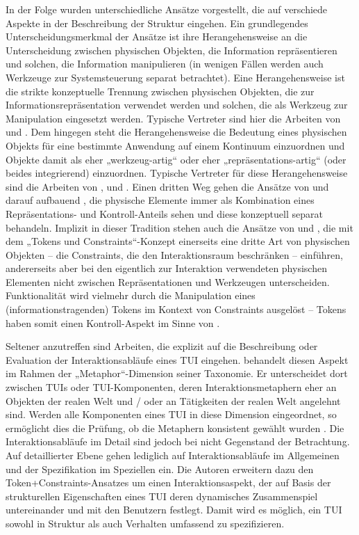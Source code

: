In der Folge wurden unterschiedliche Ansätze vorgestellt, die auf verschiede Aspekte in der Beschreibung der Struktur eingehen. Ein grundlegendes Unterscheidungsmerkmal der Ansätze ist ihre Herangehensweise an die Unterscheidung zwischen physischen Objekten, die Information repräsentieren und solchen, die Information manipulieren (in wenigen Fällen werden auch Werkzeuge zur Systemsteuerung separat betrachtet). Eine Herangehensweise ist die strikte konzeptuelle Trennung zwischen physischen Objekten, die zur Informationsrepräsentation verwendet werden und solchen, die als Werkzeug zur Manipulation eingesetzt werden. Typische Vertreter sind hier die Arbeiten von \citet{Ishii97} und \citet{Holmquist99}. Dem hingegen steht die Herangehensweise die Bedeutung eines physischen Objekts für eine bestimmte Anwendung auf einem Kontinuum einzuordnen und Objekte damit als eher „werkzeug-artig“ oder eher „repräsentations-artig“ (oder beides integrierend) einzuordnen. Typische Vertreter für diese Herangehensweise sind die Arbeiten von \citet{Underkoffler99}, \citet{Koleva03} und \citet{Fishkin04}. Einen dritten Weg gehen die Ansätze von \citet{Ullmer00} und darauf aufbauend \citet{Ishii08}, die physische Elemente immer als Kombination eines Repräsentations- und Kontroll-Anteils sehen und diese konzeptuell separat behandeln. Implizit in dieser Tradition stehen auch die Ansätze von \citet{Ullmer02} und \citet{Shaer04}, die mit dem „Tokens und Constraints“-Konzept einerseits eine dritte Art von physischen Objekten -- die Constraints, die den Interaktionsraum beschränken -- einführen, andererseits aber bei den eigentlich zur Interaktion verwendeten physischen Elementen nicht zwischen Repräsentationen und Werkzeugen unterscheiden. Funktionalität wird vielmehr durch die Manipulation eines (informationstragenden) Tokens im Kontext von Constraints ausgelöst -- Tokens haben somit einen Kontroll-Aspekt im Sinne von \citet{Ullmer00}.

Seltener anzutreffen sind Arbeiten, die explizit auf die Beschreibung oder Evaluation der Interaktionsabläufe eines \gls{TUI} eingehen. \citet{Fishkin04} behandelt diesen Aspekt im Rahmen der „Metaphor“-Dimension seiner Taxonomie. Er unterscheidet dort zwischen \glspl{TUI} oder \gls{TUI}-Komponenten, deren Interaktionsmetaphern eher an Objekten der realen Welt und / oder an Tätigkeiten der realen Welt angelehnt sind. Werden alle Komponenten eines \gls{TUI} in diese Dimension eingeordnet, so ermöglicht dies die Prüfung, ob die Metaphern konsistent gewählt wurden  
\citep{Oppl09d}. Die Interaktionsabläufe im Detail sind jedoch bei \citet{Fishkin04} nicht Gegenstand der Betrachtung. Auf detaillierter Ebene gehen lediglich \citet{Shaer04} auf Interaktionsabläufe im Allgemeinen und der Spezifikation im Speziellen ein. Die Autoren erweitern dazu den Token+Constraints-Ansatzes \citep{Ullmer02} um einen Interaktionsaspekt, der auf Basis der strukturellen Eigenschaften eines \gls{TUI} deren dynamisches Zusammenspiel untereinander und mit den Benutzern festlegt. Damit wird es möglich, ein \gls{TUI} sowohl in Struktur als auch Verhalten umfassend zu spezifizieren.

